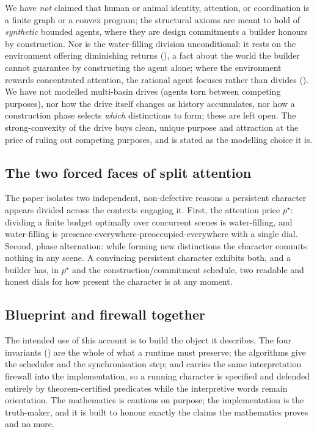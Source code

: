 \documentclass[11pt,twocolumn,a4paper]{article}
\newcommand{\price}{p^{\star}}       %
\begin{document}
We have \emph{not} claimed that human or animal identity, attention, or
coordination is a finite graph or a convex program; the structural axioms
are meant to hold of \emph{synthetic} bounded agents, where they are design
commitments a builder honours by construction. Nor is the water-filling
division unconditional: it rests on the environment offering diminishing
returns (), a fact about the world the builder cannot
guarantee by constructing the agent alone; where the environment rewards
concentrated attention, the rational agent focuses rather than divides
(). We have not modelled
multi-basin drives (agents torn between competing purposes), nor how the
drive itself changes as history accumulates, nor how a construction phase
selects \emph{which} distinctions to form; these are left open. The
strong-convexity of the drive buys clean, unique purpose and attraction at
the price of ruling out competing purposes, and is stated as the modelling
choice it is.

\subsection{The two forced faces of split attention}

The paper isolates two independent, non-defective reasons a persistent
character appears divided across the contexts engaging it. First, the
attention price $\price$: dividing a finite budget optimally over
concurrent scenes is water-filling, and water-filling is
presence-everywhere-preoccupied-everywhere with a single dial. Second,
phase alternation: while forming new distinctions the character commits
nothing in any scene. A convincing persistent character exhibits both, and
a builder has, in $\price$ and the construction/commitment schedule, two
readable and honest dials for how present the character is at any moment.

\subsection{Blueprint and firewall together}

The intended use of this account is to build the object it describes. The
four invariants () are the whole of what a runtime
must preserve; the algorithms give the scheduler and the synchronisation
step; and  carries the same interpretation firewall
into the implementation, so a running character is specified and defended
entirely by theorem-certified predicates while the interpretive words
remain orientation. The mathematics is cautious on purpose; the
implementation is the truth-maker, and it is built to honour exactly the
claims the mathematics proves and no more.
\end{document}
